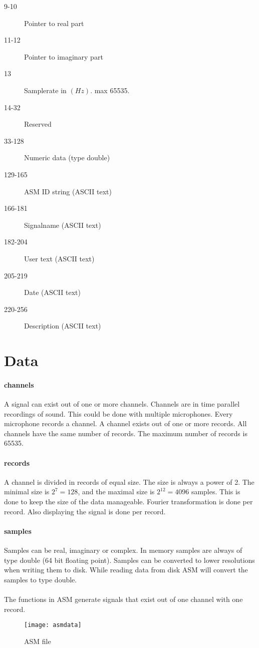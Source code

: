\documentclass{report}
\begin{document}
\begin{description}
\item[9-10] Pointer to real part
\item[11-12] Pointer to imaginary part
\item[13] Samplerate in $(Hz)$. max 65535.
\item[14-32] Reserved
\item[33-128] Numeric data (type double)
\item[129-165] ASM ID string (ASCII text)
\item[166-181] Signalname (ASCII text)
\item[182-204] User text (ASCII text)
\item[205-219] Date (ASCII text)
\item[220-256] Description (ASCII text)
\end{description}

\section{Data}

\paragraph{channels}
A signal can exist out of one or more channels. Channels
are in time parallel recordings of sound. This could be
done with multiple microphones. Every microphone records
a channel. A channel exists out of one or more records.
All channels have the same number of records. The maximum
number of records is 65535.

\paragraph{records}
A channel is divided in records of equal size. The size is always
a power of 2. The minimal size is $2^{7}=128$, and the
maximal size is $2^{12}=4096$ samples. This is done to
keep the size of the data manageable. Fourier transformation is
done per record. Also displaying the signal is done per record.

\paragraph{samples}
Samples can be real, imaginary or complex. In memory samples
are always of type double (64 bit floating point). Samples
can be converted to lower resolutions when writing them to disk.
While reading data from disk ASM will convert the samples to
type double.

\paragraph{}
The functions in ASM generate signals that exist out of one channel
with one record.

\begin{figure}[h]
\centerline{\texttt{[image: asmdata]}}
\caption{ASM file}
\label{fig:asmfile}
\end{figure}
\end{document}
